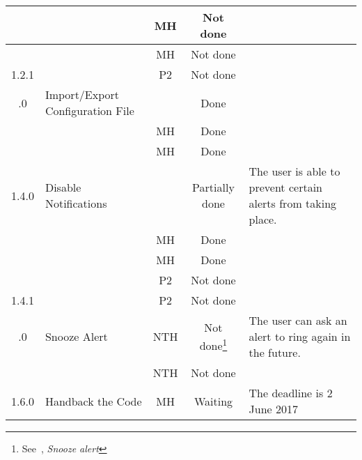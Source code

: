 \begin{longtable}{| c | p{5cm} | c | c | p{5cm} |}
	\rowcolor{aliceblue}& \fullref{subsec:usecase_add_category} & MH & Not done\footref{ftn:categories} & \\ \hline
	\rowcolor{aliceblue}& \fullref{subsec:usecase_delete_category} & MH & Not done\footref{ftn:categories} & \\ \hline
	\rowcolor{aliceblue}1.2.1 & \fullref{subsec:usecase_edit_category} & P2 & Not done\footref{ftn:categories} & \\ \boldhr
	1.3.0 & Import/Export Configuration File &  & Done & \\ \hline
	& \fullref{subsec:usecase_import_configuration} & MH & Done & \\ \hline
	& \fullref{subsec:usecase_export_configuration} & MH & Done & \\ \boldhr
	\rowcolor{aliceblue}1.4.0 & Disable Notifications &  & Partially done & The user is able to prevent certain alerts from taking place.\\ \hline
	\rowcolor{aliceblue}& \fullref{subsec:usecase_silent_on} & MH & Done & \\ \hline
	\rowcolor{aliceblue}& \fullref{subsec:usecase_silent_off} & MH & Done & \\ \hline
	\rowcolor{aliceblue}& \fullref{subsec:usecase_mute_category} & P2 & Not done\footref{ftn:categories} & \\ \hline
	\rowcolor{aliceblue}1.4.1 & \fullref{subsec:usecase_unmute_category} & P2 & Not done\footref{ftn:categories} & \\ \boldhr
	1.5.0 & Snooze Alert & NTH & Not done\footnote{\label{ftn:snooze}See~\fullref{sec:unimplreq}, \textit{Snooze alert}} & The user can ask an alert to ring again in the future. \\ \hline
	& \fullref{subsec:usecase_snooze_alert} & NTH & Not done\footref{ftn:snooze} & \\ \boldhr
	\rowcolor{aliceblue}1.6.0 & Handback the Code & MH & Waiting & The deadline is 2 June 2017 \\ \hline
\end{longtable}
